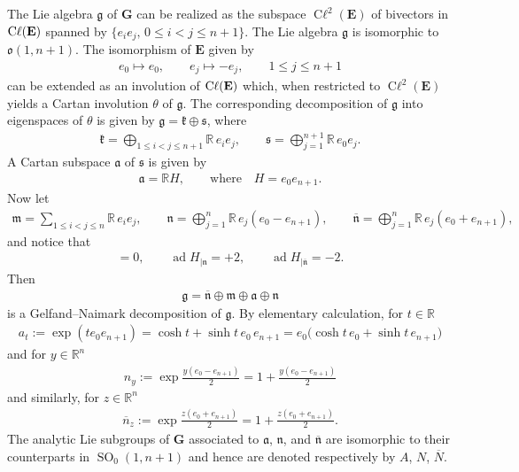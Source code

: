 \documentclass[10pt,a4paper]{amsart}
\DeclareMathOperator{\cl}{C\ell} %
\DeclareMathOperator{\ad}{ad}
\DeclareMathOperator{\SO}{SO}
\numberwithin{equation}{section}
\begin{document}
The Lie algebra $\mathbf {\mathfrak g}$ of $\mathbf G$ can be realized as the subspace $\cl^2(\mathbf E)$ of bivectors in $\cl(\bf E)$ spanned by $\{e_ie_j,\, 0\leq i<j\leq n+1\}$.
The Lie algebra $\mathfrak g$ is isomorphic to $\mathfrak o(1,n+1)$. The isomorphism of $\mathbf E$ given by
 \begin{gather*}
 e_0 \mapsto e_0,\qquad e_j \mapsto - e_j,\qquad
 1\leq j\leq n+1
 \end{gather*}
 can be extended as an involution of $\cl(\bf E)$ which, when restricted to
$\cl^2(\mathbf E)$ yields a Cartan involution $\theta$ of $\mathfrak g$. The corresponding decomposition of $\mathfrak g$ into eigenspaces of $\theta$ is given by $\mathfrak g = \mathfrak k\oplus \mathfrak s$, where
\begin{gather*}
\mathfrak k = \bigoplus_{1\leq i<j\leq n+1} \mathbb R\, e_ie_j,\qquad
\mathfrak s = \bigoplus_{j=1}^{n+1}\mathbb R\, e_0e_j .
\end{gather*}
A Cartan subspace $\mathfrak a$ of $\mathfrak s$ is given by
\begin{gather*}
\mathfrak a = \mathbb R H,\qquad \text{where}\quad H=e_0e_{n+1} .
\end{gather*}
Now let
\begin{gather*}
\mathfrak m = \sum_{1\leq i<j\leq n} \mathbb R\, e_ie_j,\qquad
\mathfrak n = \bigoplus_{j=1}^n \mathbb R\, e_j(e_0-e_{n+1}),\qquad \overline{\mathfrak n} = \bigoplus_{j=1}^n \mathbb R\, e_j(e_0+e_{n+1}) ,
\end{gather*}
and notice that
\begin{gather*}
[H,\mathfrak m] = 0,\qquad
\ad H_{\vert \mathfrak n} = +2, \qquad
\ad H_{\vert \overline{\mathfrak n}} = -2 .
\end{gather*}
Then
\begin{gather*}
\mathfrak g = \overline{\mathfrak n}\oplus \mathfrak m\oplus \mathfrak a\oplus \mathfrak n
\end{gather*}
is a Gelfand--Naimark decomposition of $\mathfrak g$. By elementary calculation, for $t\in \mathbb R$
\begin{gather*}
a_t:=\exp(te_0e_{n+1}) = \cosh t +\sinh t\, e_0\, e_{n+1} = e_0\big(\cosh t \,e_0+\sinh t \,e_{n+1}\big)
\end{gather*}
and for $y\in \mathbb R^n$
\begin{gather*}
n_y := \exp \frac{y(e_0-e_{n+1})}{2} = 1+\frac{y(e_0-e_{n+1})}{2}
\end{gather*}
and similarly, for $z\in \mathbb R^n$
\begin{gather*}
\overline n_z := \exp \frac{z(e_0+e_{n+1})}{2} = 1+\frac{z(e_0+e_{n+1})}{2} .
\end{gather*}
The analytic Lie subgroups of $\mathbf G$ associated to $\mathfrak a$, $\mathfrak n$, and $\mathfrak {\overline n}$ are isomorphic to their counterparts in $\SO_0(1,n+1)$ and hence are denoted respectively by $A$, $N$, $\overline N$.
\end{document}
